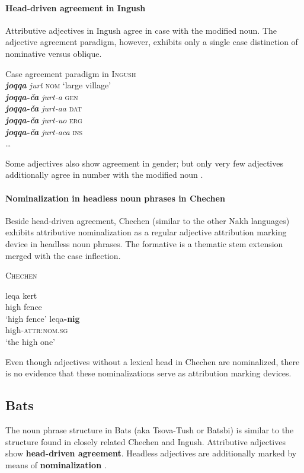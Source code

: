 \paragraph{Head-driven agreement in Ingush}
Attributive adjectives in Ingush agree in case with the modified noun. The adjective agreement paradigm, however, exhibits only a single case distinction of nominative versus oblique.
\begin{exe}
\ex Case agreement paradigm in \textsc{Ingush} \citep[99]{nichols1994b}\\
\textit{\textbf{joqqa} jurt} \textsc{nom} ‘large village’\\
\textit{\textbf{joqqa-ča} jurt-a} \textsc{gen}\\
\textit{\textbf{joqqa-ča} jurt-aa} \textsc{dat}\\
\textit{\textbf{joqqa-ča} jurt-uo} \textsc{erg}\\
\textit{\textbf{joqqa-ča} jurt-aca} \textsc{ins}\\
\dots \label{ingush agr}
\end{exe}
Some adjectives also show agreement in gender; but only very few adjectives additionally agree in number with the modified noun \citep[99]{nichols1994b}.

\paragraph{Nominalization in headless noun phrases in Chechen}
Beside head-driven agreement, Che\-chen (similar to the other Nakh languages) exhibits attributive nominalization as a regular adjective attribution marking device in headless noun phrases. The formative is a thematic stem extension merged with the case inflection.
\begin{exe}
\ex \textsc{Chechen} \citep[29]{nichols1994a}
\begin{xlist}
\ex
\gll	leqa kert\\
	high fence\\
\glt	‘high fence’
\ex	
\gll	leqa\textbf{-nig}\\
	high-\textsc{attr:nom.sg}\\
\glt	‘the high one’
\end{xlist}
\end{exe}
Even though adjectives without a lexical head in Chechen are nominalized, there is no evidence that these nominalizations serve as attribution marking devices.

\subsection{Bats}
The noun phrase structure in Bats (aka Tsova-Tush or Batsbi) is similar to the structure found in closely related Chechen and Ingush. Attributive adjectives show \textbf{head-driven agreement}. Headless adjectives are additionally marked by means of \textbf{nominalization} \cite[172–172]{holisky-etal1994}. 

